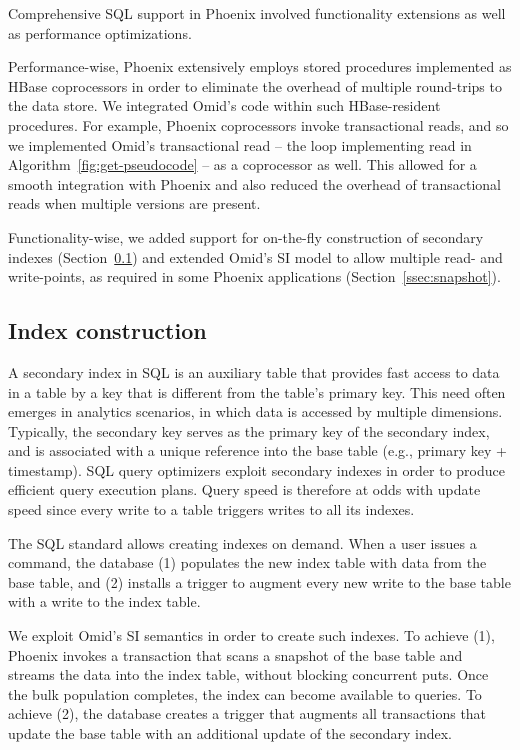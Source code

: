

Comprehensive SQL support in Phoenix involved functionality extensions as well 
as performance optimizations. 

Performance-wise, 
Phoenix extensively employs stored procedures implemented as HBase coprocessors
in order to eliminate the overhead of multiple round-trips to the data store. 
We integrated Omid's code within such HBase-resident procedures.
For example, Phoenix coprocessors invoke transactional reads, and so we implemented Omid's 
transactional read -- the loop implementing read in Algorithm~\ref{fig:get-pseudocode} -- as a coprocessor as well. 
This allowed for a smooth integration  with Phoenix and also reduced the overhead of transactional
reads when multiple versions are present.

Functionality-wise, we added support for on-the-fly construction of secondary indexes
(Section~\ref{ssec:indexes}) and extended 
Omid's SI model to allow  multiple read- and write-points, as required 
in some Phoenix applications (Section~\ref{ssec:snapshot}). 

\subsection{Index construction}
\label{ssec:indexes}

A secondary index in SQL is an auxiliary table that provides fast access to data in a table 
by a key that is different from the table's primary key. This need often emerges in analytics scenarios, in
which data is accessed by multiple dimensions. Typically, the secondary key serves as the 
primary key of the secondary index, and is associated with a unique reference into the base table 
(e.g., primary key + timestamp). SQL query 
optimizers exploit secondary indexes in order to produce efficient query execution plans. Query speed 
is therefore at odds with update speed since every write to a table triggers writes to all its indexes. 

The SQL standard allows creating indexes on demand. When a user issues a {} 
command, the database (1) populates the new index table with  data from the base table, and
(2) installs a trigger to augment every new write to the base table with a write to the index table. 

We exploit Omid's SI semantics in order to create such indexes. To achieve (1), 
Phoenix invokes a transaction that scans a snapshot of the base table and 
streams the data into the  index table, without 
blocking concurrent puts. 
%
Once the bulk population completes, the index can become available to queries. 
To achieve (2), the database creates a trigger that augments all transactions 
that update the base table with an additional update of the secondary index. 
 

